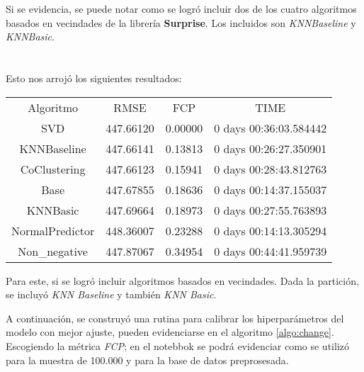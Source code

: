 \documentclass{article}
\begin{document}
Si se evidencia, se puede notar como se logró incluir dos de los cuatro algoritmos basados en vecindades de la librería \textbf{Surprise}. Los incluidos son \textit{KNNBaseline} y \textit{KNNBasic}.\\
\\

\\

Esto nos arrojó los siguientes resultados:

\begin{center}
\begin{tabular}{ c c c c }
Algoritmo & RMSE & FCP & TIME\\
SVD & 447.66120 & 0.00000 & 0 days 00:36:03.584442\\
KNNBaseline & 447.66141 & 0.13813 & 0 days 00:26:27.350901\\
CoClustering & 447.66123 & 0.15941 & 0 days 00:28:43.812763\\
Base & 447.67855 & 0.18636 & 0 days 00:14:37.155037\\
KNNBasic & 447.69664 & 0.18973 & 0 days 00:27:55.763893\\
NormalPredictor & 448.36007 & 0.23288 & 0 days 00:14:13.305294\\
Non\_negative & 447.87067 & 0.34954 & 0 days 00:44:41.959739
\end{tabular}
\end{center}

Para este, si se logró incluir algoritmos basados en vecindades. Dada la partición, se incluyó \textit{KNN Baseline} y también \textit{KNN Basic}.

A continuación, se construyó una rutina para calibrar los hiperparámetros del modelo con mejor ajuste, pueden evidenciarse en el algoritmo \ref{algo:change}. Escogiendo la métrica \textit{FCP}; en el notebbok se podrá evidenciar como se utilizó para la muestra de 100.000 y para la base de datos preprosesada. 
\end{document}

